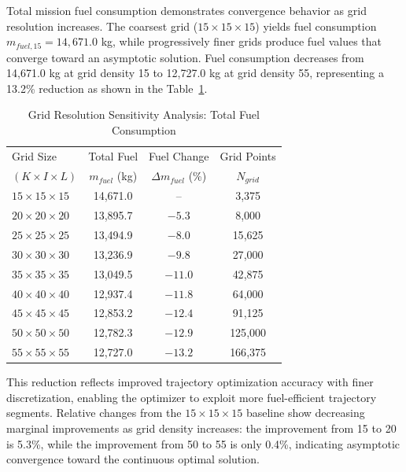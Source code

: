 Total mission fuel consumption demonstrates convergence behavior as grid resolution increases. The coarsest grid ($15 \times 15 \times 15$) yields fuel consumption $m_{fuel,15} = 14,671.0$ kg, while progressively finer grids produce fuel values that converge toward an asymptotic solution. Fuel consumption decreases from 14,671.0 kg at grid density 15 to 12,727.0 kg at grid density 55, representing a 13.2\% reduction as shown in the Table~\ref{tab:GridresolutionSensitivityAnalysis:TotalFuelConsumption}.  


\begin{table}[h]
    \centering
    \footnotesize
    \begin{tabular}{l c c c}
        \hline
        Grid Size & Total Fuel & Fuel Change & Grid Points \\
        $(K \times I \times L)$ & $m_{fuel}$ (kg) & $\Delta m_{fuel}$ (\%) & $N_{grid}$ \\
        \hline
        $15 \times 15 \times 15$ & 14{,}671.0 & -- & 3{,}375 \\
        $20 \times 20 \times 20$ & 13{,}895.7 & $-5.3$ & 8{,}000 \\
        $25 \times 25 \times 25$ & 13{,}494.9 & $-8.0$ & 15{,}625 \\
        $30 \times 30 \times 30$ & 13{,}236.9 & $-9.8$ & 27{,}000 \\
        $35 \times 35 \times 35$ & 13{,}049.5 & $-11.0$ & 42{,}875 \\
        $40 \times 40 \times 40$ & 12{,}937.4 & $-11.8$ & 64{,}000 \\
        $45 \times 45 \times 45$ & 12{,}853.2 & $-12.4$ & 91{,}125 \\
        $50 \times 50 \times 50$ & 12{,}782.3 & $-12.9$ & 125{,}000 \\
        $55 \times 55 \times 55$ & 12{,}727.0 & $-13.2$ & 166{,}375 \\
        \hline
    \end{tabular}
    \caption{Grid Resolution Sensitivity Analysis: Total Fuel Consumption}
    \label{tab:GridresolutionSensitivityAnalysis:TotalFuelConsumption}
\end{table}

This reduction reflects improved trajectory optimization accuracy with finer discretization, enabling the optimizer to exploit more fuel-efficient trajectory segments. Relative changes from the $15 \times 15 \times 15$ baseline show decreasing marginal improvements as grid density increases: the improvement from 15 to 20 is 5.3\%, while the improvement from 50 to 55 is only 0.4\%, indicating asymptotic convergence toward the continuous optimal solution.  



